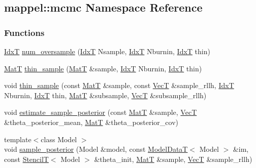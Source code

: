 \hypertarget{namespacemappel_1_1mcmc}{}\subsection{mappel\+:\+:mcmc Namespace Reference}
\label{namespacemappel_1_1mcmc}
\subsubsection*{Functions}
\begin{DoxyCompactItemize}
\item 
\hyperlink{namespacemappel_ab17ec0f30b61ece292439d7ece81d3a8}{IdxT} \hyperlink{namespacemappel_1_1mcmc_a29219ed7564edad6489889dc2ec2a0d6}{num\+\_\+oversample} (\hyperlink{namespacemappel_ab17ec0f30b61ece292439d7ece81d3a8}{IdxT} Nsample, \hyperlink{namespacemappel_ab17ec0f30b61ece292439d7ece81d3a8}{IdxT} Nburnin, \hyperlink{namespacemappel_ab17ec0f30b61ece292439d7ece81d3a8}{IdxT} thin)
\item 
\hyperlink{namespacemappel_a7091ab87c528041f7e2027195fad8915}{MatT} \hyperlink{namespacemappel_1_1mcmc_a2930a61f34237af553702ddaaf72c5b5}{thin\+\_\+sample} (\hyperlink{namespacemappel_a7091ab87c528041f7e2027195fad8915}{MatT} \&sample, \hyperlink{namespacemappel_ab17ec0f30b61ece292439d7ece81d3a8}{IdxT} Nburnin, \hyperlink{namespacemappel_ab17ec0f30b61ece292439d7ece81d3a8}{IdxT} thin)
\item 
void \hyperlink{namespacemappel_1_1mcmc_a9e20794d8718ad2230529af28855e542}{thin\+\_\+sample} (const \hyperlink{namespacemappel_a7091ab87c528041f7e2027195fad8915}{MatT} \&sample, const \hyperlink{namespacemappel_a2225ad69f358daa3f4f99282a35b9a3a}{VecT} \&sample\+\_\+rllh, \hyperlink{namespacemappel_ab17ec0f30b61ece292439d7ece81d3a8}{IdxT} Nburnin, \hyperlink{namespacemappel_ab17ec0f30b61ece292439d7ece81d3a8}{IdxT} thin, \hyperlink{namespacemappel_a7091ab87c528041f7e2027195fad8915}{MatT} \&subsample, \hyperlink{namespacemappel_a2225ad69f358daa3f4f99282a35b9a3a}{VecT} \&subsample\+\_\+rllh)
\item 
void \hyperlink{namespacemappel_1_1mcmc_a5bcba6b4606530ab7c6b03e91accc735}{estimate\+\_\+sample\+\_\+posterior} (const \hyperlink{namespacemappel_a7091ab87c528041f7e2027195fad8915}{MatT} \&sample, \hyperlink{namespacemappel_a2225ad69f358daa3f4f99282a35b9a3a}{VecT} \&theta\+\_\+posterior\+\_\+mean, \hyperlink{namespacemappel_a7091ab87c528041f7e2027195fad8915}{MatT} \&theta\+\_\+posterior\+\_\+cov)
\item 
{\footnotesize template$<$class Model $>$ }\\void \hyperlink{namespacemappel_1_1mcmc_a788cb1c156fa3b03724c3a44fe9e83ce}{sample\+\_\+posterior} (Model \&model, const \hyperlink{namespacemappel_a97f050df953605381ae9c901c3b125f1}{Model\+DataT}$<$ Model $>$ \&im, const \hyperlink{namespacemappel_a3a06598240007876f8c4bf834ad86197}{StencilT}$<$ Model $>$ \&theta\+\_\+init, \hyperlink{namespacemappel_a7091ab87c528041f7e2027195fad8915}{MatT} \&sample, \hyperlink{namespacemappel_a2225ad69f358daa3f4f99282a35b9a3a}{VecT} \&sample\+\_\+rllh)

\end{DoxyCompactItemize}
